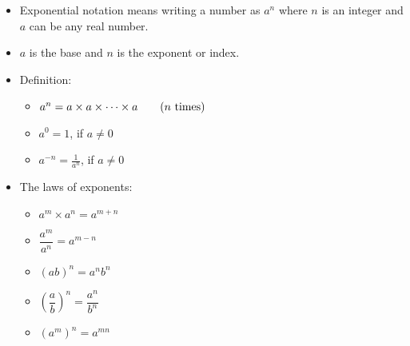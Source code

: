 \begin{itemize}[noitemsep, label=\textbullet{}]
\item Exponential notation means writing a number as ${a}^{n}$ where $n$ is an integer and $a$ can be any real number.
\item $a$ is the base and $n$ is the exponent or index.
\item Definition: 
  \begin{itemize}[noitemsep]
  \item ${a}^{n} = a \times a \times \cdots \times a\phantom{\rule{2.em}{0ex}}(\mbox{$n$ times})$
  \item ${a}^{0} = 1$, if $a \ne 0$
  \item ${a}^{-n}=\frac{1}{{a}^{n}}$, if $a \ne 0$
  \end{itemize}
\item  The laws of exponents: 
  \begin{itemize}[itemsep=4pt]
  \item  ${a}^{m}  \times {a}^{n}={a}^{m+n}$
  \item  $\dfrac{{a}^{m}}{{a}^{n}}={a}^{m-n}$
  \item  ${(ab)}^{n}={a}^{n}{b}^{n}$
  \item  $\left(\dfrac{a}{b}\right)^n = \dfrac{a^n}{b^n}$
  \item  ${({a}^{m})}^{n}={a}^{mn}$
  \end{itemize}
\end{itemize}

